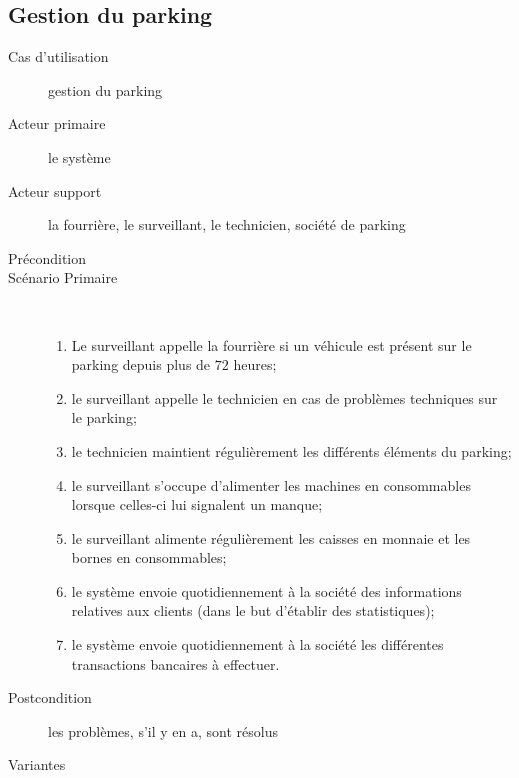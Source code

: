 \documentclass[a4paper]{article}
\begin{document}
\subsection{Gestion du parking}
\begin{description}
	\item[Cas d'utilisation] gestion du parking
	\item[Acteur primaire] le syst\`eme
	\item[Acteur support]  la fourri\`ere, le surveillant, le technicien, soci\'et\'e
				de parking
	\item[Pr\'econdition] 
	\item[Sc\'enario Primaire] \
	\begin{enumerate}
		\item Le surveillant appelle la fourri\`ere si un v\'ehicule est
			pr\'esent sur le parking depuis plus de $72$ heures;
		\item le surveillant appelle le technicien en cas de probl\`emes
			techniques sur le parking;
		\item le technicien maintient r\'eguli\`erement les diff\'erents
			\'el\'ements du parking;
		\item le surveillant s'occupe d'alimenter les machines en consommables
			lorsque celles-ci lui signalent un manque;
		\item le surveillant alimente r\'eguli\`erement les caisses en
			monnaie et les bornes en consommables;
		\item le syst\`eme envoie quotidiennement \`a la soci\'et\'e des
			informations relatives aux clients (dans le but d'\'etablir des
			statistiques);
		\item le syst\`eme envoie quotidiennement \`a la soci\'et\'e les
			diff\'erentes transactions bancaires \`a effectuer.
	\end{enumerate}
	\item[Postcondition] les probl\`emes, s'il y en a, sont r\'esolus
	\item[Variantes] \
\end{description}
\end{document}
